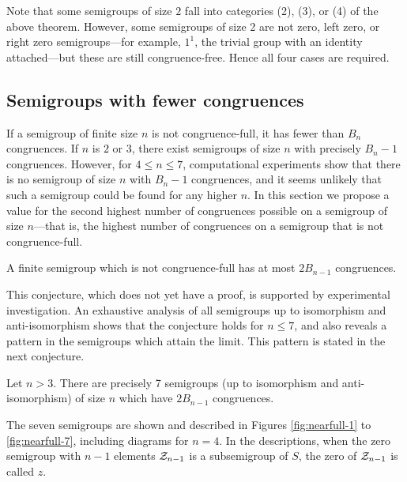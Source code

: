 Note that some semigroups of size $2$ fall into categories (2), (3), or (4) of
the above theorem.  However, some semigroups of size 2 are not zero, left zero,
or right zero semigroups---for example, $1^1$, the trivial group with an
identity attached---but these are still congruence-free.  Hence all four cases
are required.



\subsection{Semigroups with fewer congruences}

If a semigroup of finite size $n$ is not congruence-full, it has fewer than
$B_n$ congruences.  If $n$ is $2$ or $3$, there exist semigroups of size $n$
with precisely $B_n - 1$ congruences.  However, for $4 \leq n \leq 7$,
computational experiments show that there is no semigroup of size $n$ with
$B_n - 1$ congruences, and it seems unlikely that such a semigroup could be
found for any higher $n$.  In this section we propose a value for the second
highest number of congruences possible on a semigroup of size $n$---that is, the
highest number of congruences on a semigroup that is not congruence-full.

\begin{conjecture}
  \label{conj:not-cong-full}
  A finite semigroup which is not congruence-full has at most
  $2B_{n-1}$ congruences.
\end{conjecture}

This conjecture, which does not yet have a proof, is supported by experimental
investigation.  An exhaustive analysis of all semigroups up to isomorphism and
anti-isomorphism shows that the conjecture holds for $n \leq 7$, and also
reveals a pattern in the semigroups which attain the limit.  This pattern is
stated in the next conjecture.

\begin{conjecture}
  \label{conj:cong-nearfull-7}
  Let $n > 3$.  There are precisely 7 semigroups (up to isomorphism and
  anti-isomorphism) of size $n$ which have $2B_{n-1}$ congruences.
\end{conjecture}

The seven semigroups are shown and described in Figures \ref{fig:nearfull-1} to
\ref{fig:nearfull-7}, including diagrams for $n = 4$.  In the descriptions, when
the zero semigroup with $n-1$ elements $\mathcal{Z}_{n-1}$ is a subsemigroup of $S$, the
zero of $\mathcal{Z}_{n-1}$ is called $z$.  

